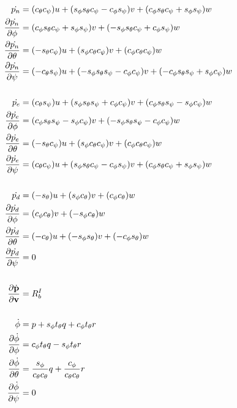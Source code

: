 \documentclass[a4paper]{article}
\begin{document}
\begin{align*}
  \dot{p_n} &= (\ctheta \cpsi)u + (\sphi \stheta \cpsi - \cphi \spsi)v +
    (\cphi \stheta \cpsi + \sphi \spsi)w \\
  \frac{\partial \dot{p_n}}{\partial \phi} &= (\cphi \stheta \cpsi + \sphi
    \spsi) v + (-\sphi \stheta \cpsi + \cphi \spsi) w \\
  \frac{\partial \dot{p_n}}{\partial \theta} &= (-\stheta \cpsi) u + (\sphi
    \ctheta \cpsi) v + (\cphi \ctheta \cpsi) w \\
  \frac{\partial \dot{p_n}}{\partial \psi} &= (-\ctheta \spsi) u +(-\sphi
    \stheta \spsi - \cphi \cpsi) v + (-\cphi \stheta \spsi + \sphi \cpsi)
    w \\
  \\
  \dot{p_e} &= (\ctheta \spsi)u + (\sphi \stheta \spsi + \cphi \cpsi)v +
    (\cphi \stheta \spsi - \sphi \cpsi)w \\
  \frac{\partial \dot{p_e}}{\partial \phi} &= (\cphi \stheta \spsi - \sphi
    \cpsi) v + (-\sphi \stheta \spsi - \cphi \cpsi) w \\
  \frac{\partial \dot{p_e}}{\partial \theta} &= (-\stheta \cpsi)u + (\sphi
    \ctheta \cpsi)v + (\cphi \ctheta \cpsi)w \\
  \frac{\partial \dot{p_e}}{\partial \psi} &= (\ctheta \cpsi) u + (\sphi \stheta
    \cpsi - \cphi \spsi) v + (\cphi \stheta \cpsi + \sphi \spsi) w \\
  \\
  \dot{p_d} &= (-\stheta)u + (\sphi \ctheta)v + (\cphi \ctheta)w \\
  \frac{\partial \dot{p_d}}{\partial \phi} &= (\cphi \ctheta) v + (-\sphi
    \ctheta) w \\
  \frac{\partial \dot{p_d}}{\partial \theta} &= (-\ctheta) u + (-\sphi \stheta)
    v + (-\cphi \stheta) w \\
  \frac{\partial \dot{p_d}}{\partial \psi} &= 0 \\
  \\
  \frac{\partial \dot{\vect{p}}}{\partial {\vect{v}}} &= R_b^I \\
  \\
  \dot{\phi} &= p + \sphi \ttheta q + \cphi \ttheta r \\
  \frac{\partial \dot{\phi}}{\partial \phi} &= \cphi \ttheta q -
    \sphi \ttheta r \\
  \frac{\partial \dot{\phi}}{\partial \theta} &= \frac{\sphi}{\ctheta \ctheta} q
    + \frac{\cphi}{\ctheta \ctheta} r \\
  \frac{\partial \dot{\phi}}{\partial \psi} &= 0 \\

\end{align*}
\end{document}
